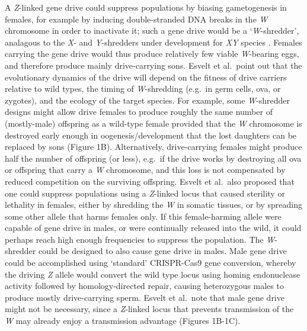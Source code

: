 \documentclass[]{rsos}%
\begin{document}
A \emph{Z}-linked gene drive could suppress populations by biasing
gametogenesis in females, for example by inducing double-stranded DNA
breaks in the \emph{W} chromosome in order to inactivate it; such a gene
drive would be a `\emph{W}-shredder', analagous to the \emph{X}- and
\emph{Y}-shredders under development for \emph{XY} species
\citep{windbichler2008ta, north2013mo, galizi2014sy, burt2018se, papathanos2018re, prowse2019}.
Females carrying the gene drive would thus produce relatively few viable
\emph{W}-bearing eggs, and therefore produce mainly drive-carrying sons.
Esvelt et al.~point out that the evolutionary dynamics of the drive will
depend on the fitness of drive carriers relative to wild types, the
timing of \emph{W}-shredding (e.g.~in germ cells, ova, or zygotes), and
the ecology of the target species. For example, some \emph{W}-shredder
designs might allow drive females to produce roughly the same number of
(mostly-male) offspring as a wild-type female provided that the \emph{W}
chromosome is destroyed early enough in oogenesis/development that the
lost daughters can be replaced by sons (Figure 1B). Alternatively,
drive-carrying females might produce half the number of offspring (or
less), e.g.~if the drive works by destroying all ova or offspring that
carry a \emph{W} chromosome, and this loss is not compensated by reduced
competition on the surviving offspring. Esvelt et al.~also proposed that
one could suppress populations using a \emph{Z}-linked locus that caused
sterility or lethality in females, either by shredding the \emph{W} in
somatic tissues, or by spreading some other allele that harms females
only. If this female-harming allele were capable of gene drive in males,
or were continually released into the wild, it could perhaps reach high
enough frequencies to suppress the population. The \emph{W}-shredder
could be designed to also cause gene drive in males. Male gene drive
could be accomplished using `standard' CRISPR-Cas9 gene conversion,
whereby the driving \emph{Z} allele would convert the wild type locus
using homing endonuclease activity followed by homology-directed repair,
causing heterozygous males to produce mostly drive-carrying sperm.
Esvelt et al.~note that male gene drive might not be necessary, since a
\emph{Z}-linked locus that prevents transmission of the \emph{W} may
already enjoy a transmission advantage (Figures 1B-1C).
\end{document}
